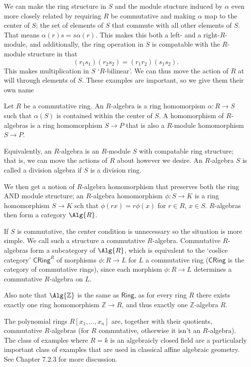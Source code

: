 We can make the ring structure in $S$ and the module stucture induced by $\alpha $ even more closely related by requiring $R$ be commutative and making $\alpha $ map to the center of $S$; the set of elements of $S$ that commute with all other elements of $S$. That means $\alpha (r)s=s\alpha (r)$. This makes this both a left- and a right-$R$-module, and additionally, the ring operation in $S$ is compatable with the $R$-module structure in that
\[
	(r_1s_1)(r_2s_2)=(r_1r_2)(s_1s_2)
.\]
This makes multiplication in $S$ `$R$-bilinear'. We can thus move the action of $R$ at will through elements of $S$. These examples are important, so we give them their own name
\begin{definition}[$R$-algebra]\label{dfn:3.5.3}
	Let $R$ be a commutative ring. An $R$-algebra is a ring homomorpism $\alpha : R \to S$ such that $\alpha (S)$ is contained within the center of $S$. A homomorphism of $R$-algebras is a ring homomorphism $S\to P$ that is also a $R$-module homomorphism $S\to P$.
\end{definition}

Equivalently, an $R$-algebra is an $R$-module $S$ with compatable ring structure; that is, we can move the actions of $R$ about however we desire. An  $R$-algebra $S$ is called a division algebra if $S$ is a division ring.

We then get a notion of $R$-algebra homomorphism that preserves both the ring AND module structure; an $R$-algebra homomorphism $\phi : S \to K$ is a ring homomorphism $S\to K$ sch that $\phi (rx)=r\phi (x)$ for $r\in R$, $x\in S$. $R$-algebras then form a category $\Alg{R}$.

If $S$ is commutative, the center condition is unnecessary so the situation is more simple. We call such a structure a commutative $R$-algebra. Commutative $R$-algebras form a subcategory of $\Alg{R}$, which is equivalent to the `coslice category' $\mathsf{CRing}^R$ of morphisms $\phi : R \to L$ for $L$ a commutative ring ($\mathsf{CRing}$ is the category of commutative rings), since each morphism $\phi : R \to L$ determines a commutative $R$-algebra on $L$.

Also note that $\Alg{\mathbb{Z}}$ is the same as $\mathsf{Ring}$, as for every ring $R$ there exists exactly one ring homomorphism $\mathbb{Z}\to R$, and thus exactly one $\mathbb{Z}$-algebra $R$.

The polynomial rings $R[x_1, \dots, x_n ]$ are, together with their quotients, commutative $R$-algebras (for $R$ commutative, otherwise it isn't an $R$-algebra).  The class of examples where $R=k$ is an algebraicly closed field are a particularly important class of examples that are used in classical affine algebraic geometry. See Chapter 7.2.3 for more discussion.

